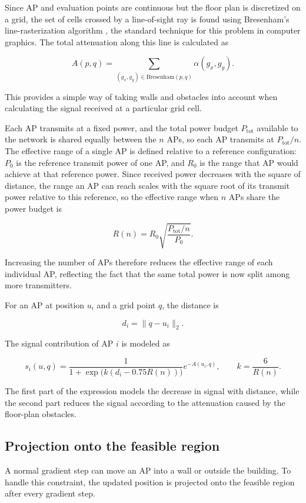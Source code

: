 \documentclass[11pt]{article}
\begin{document}
Since AP and evaluation points are continuous but the floor plan is
discretized on a grid, the set of cells crossed by a line-of-sight ray
is found using Bresenham's line-rasterization algorithm
\cite{bresenham1965algorithm}, the standard technique for this problem
in computer graphics. The total attenuation along
this line is calculated as

\[
A(p,q)=
\sum_{(g_x,g_y)\in\text{Bresenham}(p,q)}
\alpha(g_x,g_y).
\]

This provides a simple way of taking walls and obstacles into account
when calculating the signal received at a particular grid cell.

Each AP transmits at a fixed power, and the total power budget
$P_{\text{tot}}$ available to the network is shared equally between
the $n$ APs, so each AP transmits at $P_{\text{tot}}/n$. The effective
range of a single AP is defined relative to a reference configuration:
$P_0$ is the reference transmit power of one AP, and $R_0$ is the
range that AP would achieve at that reference power. Since received
power decreases with the square of distance, the range an AP can reach
scales with the square root of its transmit power relative to this
reference, so the effective range when $n$ APs share the power budget
is

\[
R(n)=R_0\sqrt{\dfrac{P_{\text{tot}}/n}{P_0}}.
\]

Increasing the number of APs therefore reduces the effective range of
each individual AP, reflecting the fact that the same total power is
now split among more transmitters.

For an AP at position $u_i$ and a grid point $q$, the distance is

\[
d_i=\lVert q-u_i\rVert_2.
\]

The signal contribution of AP $i$ is modeled as

\[
s_i(u,q)=
\frac{1}{1+\exp\!\big(k(d_i-0.75R(n))\big)}
e^{-A(u_i,q)},
\qquad
k=\frac{6}{R(n)}.
\]

The first part of the expression models the decrease in signal with
distance, while the second part reduces the signal according to the
attenuation caused by the floor-plan obstacles.

\subsection{Projection onto the feasible region}

A normal gradient step can move an AP into a wall or outside the
building. To handle this constraint, the updated position is projected
onto the feasible region after every gradient step.
\end{document}

